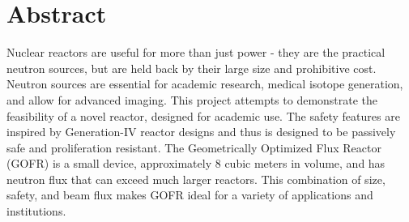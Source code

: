 \section*{Abstract}
\label{sec:abstract}
Nuclear reactors are useful for more than just power - they are the practical neutron sources, but are held back by their large size and prohibitive cost. Neutron sources are essential for academic research, medical isotope generation, and allow for advanced imaging. This project attempts to demonstrate the feasibility of a novel reactor, designed for academic use. The safety features are inspired by Generation-IV reactor designs and thus is designed to be passively safe and proliferation resistant. The Geometrically Optimized Flux Reactor (GOFR) is a small device, approximately 8 cubic meters in volume, and has neutron flux that can exceed much larger reactors. This combination of size, safety, and beam flux makes GOFR ideal for a variety of applications and institutions.